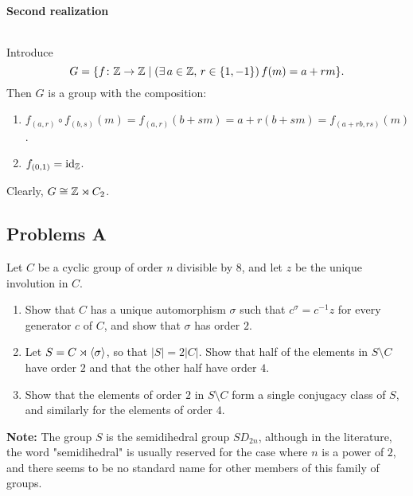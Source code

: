 \paragraph{Second realization}${}$

Introduce
$$
    G=\{f\colon\mathbb{Z}\to\mathbb{Z}\mid(\exists\,a\in\mathbb{Z},\,r\in\{1,-1\})\, f(m)=a+rm\}.
$$
Then $G$ is a group with the composition:
\begin{enumerate}[-]
    \item $f_{(a,r)}\circ f_{(b,s)}(m)=f_{(a,r)}(b+sm)=a+r(b+sm)= f_{(a+rb,rs)}(m)$.
    \item $f_{(0,1)}=\operatorname{id}_{\mathbb{Z}}$.
\end{enumerate}
Clearly, $G\cong\mathbb{Z}\rtimes C_2$.

\subsection{Problems A}

\begin{probl}
    Let\/ $C$ be a cyclic group of order\/ $n$ divisible by\/ $8$, and let\/ $z$ be the unique involution in\/ $C$.
    \begin{enumerate}[\rm a)]
    \item Show that\/ $C$ has a unique automorphism\/ $\sigma$ such that\/ $c^\sigma = c^{-1}z$ for every generator\/ $c$ of\/ $C$, and show that\/ $\sigma$ has order\/ $2$.
    
    \item Let\/ $S = C\rtimes\langle\sigma\rangle$, so that\/ $|S| = 2|C|$. Show that half of the elements in\/ $S\setminus C$ have order\/ $2$ and that the other half have order\/ $4$.
    
    \item Show that the elements of order\/ $2$ in\/ $S\setminus C$ form a single conjugacy class of\/ $S$, and similarly for the elements of order\/ $4$.
    \end{enumerate}
    
    \textrm{\rm\textbf{Note:} The group $S$ is the semidihedral group $SD_{2n}$, although in the literature, the word "semidihedral" is usually reserved for the case where $n$ is a power of $2$, and there seems to be no standard name for other members of this family of groups.}
\end{probl}

